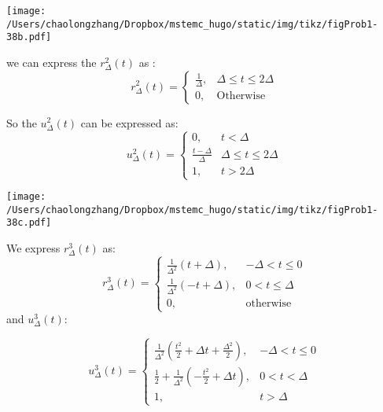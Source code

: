 \documentclass[koma,a4paper,utopia,12pt,listings-color,microtype,paralist,colorlinks,urlcolor=red]{org-article}
\begin{document}
\begin{center}
\texttt{[image: /Users/chaolongzhang/Dropbox/mstemc\_hugo/static/img/tikz/figProb1-38b.pdf]}
\end{center}



we can express the \(r_{\Delta}^{2}(t)\) as :
\begin{equation*}
r_{\Delta}^{2}(t) =
\begin{cases}
\frac{1}{\Delta} , & \Delta \leq t \leq 2\Delta \\
0, & \mathrm{Otherwise}
\end{cases}
\end{equation*}

So the \(u_{\Delta}^{2}(t)\) can be expressed as:
\begin{equation*}
u_{\Delta}^{2}(t) =
\begin{cases}
0, & t < \Delta \\
\frac{t-\Delta}{\Delta} & \Delta \leq t \leq 2\Delta \\
1, & t> 2\Delta
\end{cases}
\end{equation*}
\begin{center}
\texttt{[image: /Users/chaolongzhang/Dropbox/mstemc\_hugo/static/img/tikz/figProb1-38c.pdf]}
\end{center}

We express \(r_{\Delta}^{3}(t)\) as:
\begin{equation*}
r_{\Delta}^{3}(t) =
\begin{cases}
\frac{1}{\Delta^{2}} ( t +  \Delta) , & - \Delta < t \leq 0 \\
\frac{1}{\Delta^{2}} ( -t + \Delta) , & 0 < t \leq \Delta \\
0, & \mathrm{otherwise}
\end{cases}
\end{equation*}
and \(u_{\Delta}^{3}(t)\):

\begin{equation*}
u_{\Delta}^{3}(t) =
\begin{cases}
\frac{1}{\Delta^{2}}( \frac{t^{2}}{2} + \Delta t + \frac{\Delta^{2}}{2}) ,& -\Delta < t \leq  0 \\
\frac{1}{2} + \frac{1}{\Delta^{2}} ( - \frac{t^{2}}{2} + \Delta t ) , & 0 < t < \Delta \\
1, & t > \Delta
\end{cases}
\end{equation*}
\end{document}
